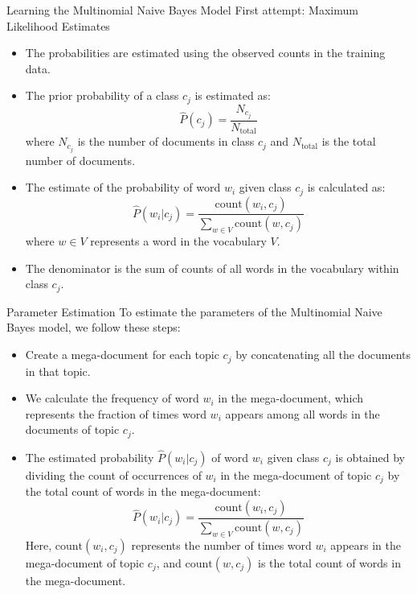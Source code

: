 \documentclass[handout]{beamer}
\begin{document}
\begin{frame}{Learning the Multinomial Naive Bayes Model}
\scriptsize
First attempt: Maximum Likelihood Estimates
\begin{itemize}
    \item The probabilities are estimated using the observed counts in the training data.
    \item The prior probability of a class $c_j$ is estimated as:
    \[
    \hat{P}(c_j) = \frac{N_{c_j}}{N_{\text{total}}}
    \]
    where $N_{c_j}$ is the number of documents in class $c_j$ and $N_{\text{total}}$ is the total number of documents.
    \item The estimate of the probability of word $w_i$ given class $c_j$ is calculated as:
    \[
    \hat{P}(w_i | c_j) = \frac{{\text{{count}}(w_i, c_j)}}{\sum_{w\in V}{\text{{count}}(w, c_j)}}
    \]
    where $w \in V$ represents a word in the vocabulary $V$.
    \item The denominator is the sum of counts of all words in the vocabulary within class $c_j$.
\end{itemize}
\end{frame}

\begin{frame}{Parameter Estimation}
\scriptsize
To estimate the parameters of the Multinomial Naive Bayes model, we follow these steps:

\begin{itemize}
  \item Create a mega-document for each topic $c_j$ by concatenating all the documents in that topic.
  \item We calculate the frequency of word $w_i$ in the mega-document, which represents the fraction of times word $w_i$ appears among all words in the documents of topic $c_j$.
  \item The estimated probability $\hat{P}(w_i | c_j)$ of word $w_i$ given class $c_j$ is obtained by dividing the count of occurrences of $w_i$ in the mega-document of topic $c_j$ by the total count of words in the mega-document:
  \[
  \hat{P}(w_i | c_j) = \frac{{\text{{count}}(w_i, c_j)}}{\sum_{w\in V}{\text{{count}}(w, c_j)}}
  \]
  Here, $\text{{count}}(w_i, c_j)$ represents the number of times word $w_i$ appears in the mega-document of topic $c_j$, and $\text{{count}}(w, c_j)$ is the total count of words in the mega-document.
\end{itemize}
\end{frame}
\end{document}
